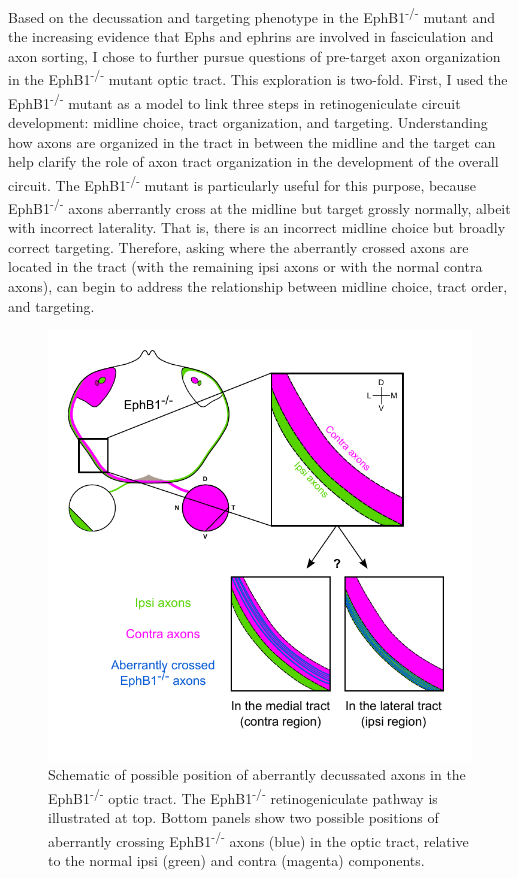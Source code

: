 \label{sec:BundleWidth}
Based on the decussation and targeting phenotype in the EphB1\textsuperscript{-/-} mutant and the increasing evidence that Ephs and ephrins are involved in fasciculation and axon sorting, I chose to further pursue questions of pre-target axon organization in the EphB1\textsuperscript{-/-} mutant optic tract.
This exploration is two-fold.
First, I used the EphB1\textsuperscript{-/-} mutant as a model to link three steps in retinogeniculate circuit development: midline choice, tract organization, and targeting.
Understanding how axons are organized in the tract in between the midline and the target can help clarify the role of axon tract organization in the development of the overall circuit.
The EphB1\textsuperscript{-/-} mutant is particularly useful for this purpose, because EphB1\textsuperscript{-/-} axons aberrantly cross at the midline but target grossly normally, albeit with incorrect laterality.
That is, there is an incorrect midline choice but broadly correct targeting.
Therefore, asking where the aberrantly crossed axons are located in the tract (with the remaining ipsi axons or with the normal contra axons), can begin to address the relationship between midline choice, tract order, and targeting.
\begin{figure}[hbtp]
    \begin{center}
        \includegraphics{Figures/EphB1_Sert_schematic_Simple.pdf}
        \caption[Schematic of possible position of aberrantly decussated axons in the EphB1\textsuperscript{-/-} optic tract.]
        {Schematic of possible position of aberrantly decussated axons in the EphB1\textsuperscript{-/-} optic tract.
        The EphB1\textsuperscript{-/-} retinogeniculate pathway is illustrated at top.
        Bottom panels show two possible positions of aberrantly crossing EphB1\textsuperscript{-/-} axons (blue) in the optic tract, relative to the normal ipsi (green) and contra (magenta) components.
        }
        \label{EphB1Sertschematic}
    \end{center}
\end{figure}


